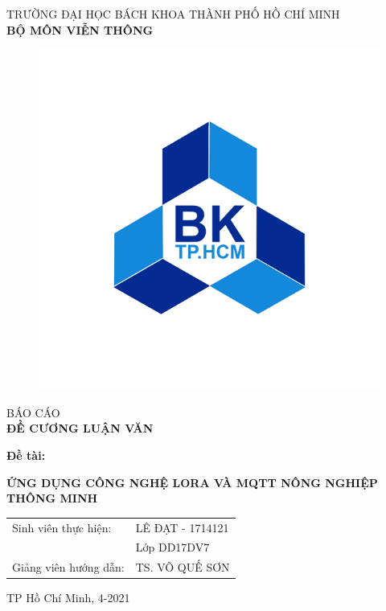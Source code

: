 \documentclass[13pt,a4paper]{article}
\begin{document}
\begin{titlepage}

\begin{center}
\vspace{-6pt} TRƯỜNG ĐẠI HỌC BÁCH KHOA THÀNH PHỐ HỒ CHÍ MINH\\
\textbf{\fontsize{16pt}{0pt}\selectfont BỘ MÔN VIỄN THÔNG}
\vspace{0.5cm}
\begin{figure}[H]
	\centering
	\includegraphics[scale=.30]{image/bachkhoa.png}
\end{figure}
\vspace{1.5cm}
\fontsize{24pt}{0pt}\selectfont BÁO CÁO\\
\vspace{12pt}
\textbf{\fontsize{32pt}{0pt}\selectfont ĐỀ CƯƠNG LUẬN VĂN}
\vspace{1cm} 
\end{center}
\textbf{\fontsize{14pt}{0pt}\selectfont Đề tài:}
\begin{center}
	\textbf{\fontsize{20pt}{0pt}\selectfont ỨNG DỤNG CÔNG NGHỆ LORA VÀ MQTT NÔNG NGHIỆP THÔNG MINH}\\
\vspace{1.5cm}
\begin{table}[H]
	\centering
	\begin{tabular}{l l}
	\fontsize{14pt}{0pt}\selectfont Sinh viên thực hiện:  &\fontsize{14pt}{0pt}\selectfont LÊ ĐẠT - 1714121 \vspace{6pt}\\
	& Lớp DD17DV7 \vspace{6pt} \\
	\fontsize{14pt}{0pt} \selectfont Giảng viên hướng dẫn:  &\fontsize{14pt}{0pt}\selectfont TS. VÕ QUẾ SƠN\\
	\end{tabular}
\end{table}
\vspace{3cm}
\fontsize{14pt}{0pt} \selectfont TP Hồ Chí Minh, 4-2021
\end{center}
\end{titlepage}
\end{document}
